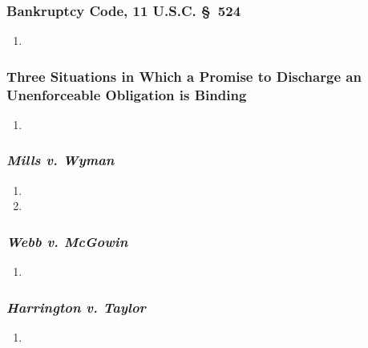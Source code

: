 \subsubsection{Bankruptcy Code, 11 U.S.C. \S\ 524}

\begin{enumerate}
    \item %
\end{enumerate}

\subsubsection{Three Situations in Which a Promise to Discharge an Unenforceable 
Obligation is Binding}

\begin{enumerate}
    \item %
\end{enumerate}

\subsubsection{\emph{Mills v. Wyman}}

\begin{enumerate}
    \item %
    \item %
\end{enumerate}

\subsubsection{\emph{Webb v. McGowin}}

\begin{enumerate}
    \item %
\end{enumerate}

\subsubsection{\emph{Harrington v. Taylor}}

\begin{enumerate}
    \item %
\end{enumerate}

